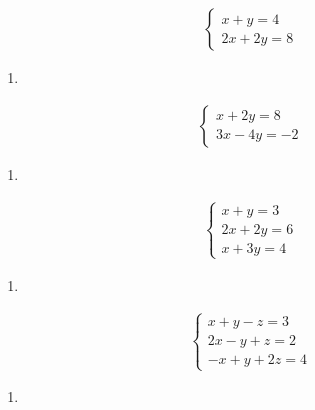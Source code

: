 \documentclass[letterpaper,10pt,italian]{jupyterBook}
\begin{document}
\begin{equation*}
\begin{split}
    \begin{cases}
    x + y = 4 \\
    2x + 2y = 8
    \end{cases}
\end{split}
\end{equation*}\begin{enumerate}
%
\setcounter{enumi}{15}
\item {} 
\end{enumerate}
\begin{equation*}
\begin{split}
    \begin{cases}
    x + 2y = 8 \\
    3x - 4y = -2
    \end{cases}
\end{split}
\end{equation*}\begin{enumerate}
%
\setcounter{enumi}{16}
\item {} 
\end{enumerate}
\begin{equation*}
\begin{split}
    \begin{cases}
    x + y = 3 \\
    2x + 2y = 6 \\
    x + 3y = 4
    \end{cases}
\end{split}
\end{equation*}\begin{enumerate}
%
\setcounter{enumi}{17}
\item {} 
\end{enumerate}
\begin{equation*}
\begin{split}
    \begin{cases}
    x + y - z = 3 \\
    2x - y + z = 2 \\
    -x + y + 2z = 4
    \end{cases}
\end{split}
\end{equation*}\begin{enumerate}
%
\setcounter{enumi}{18}
\item {} 
\end{enumerate}
\end{document}
